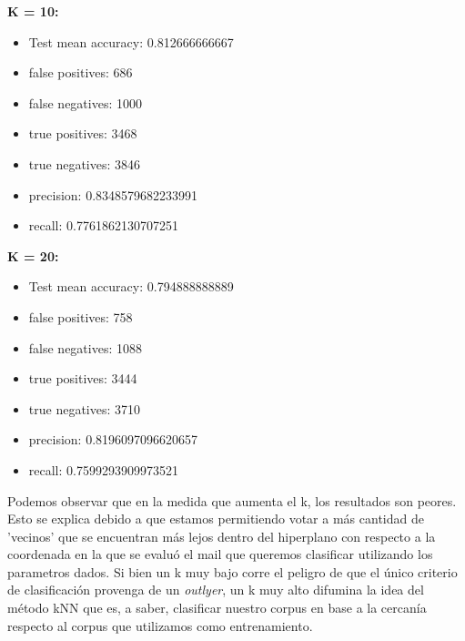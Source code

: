 \documentclass[10pt,a4paper]{article}
\begin{document}
\textbf{K = 10:}
\begin{itemize}
	\item Test mean accuracy: 0.812666666667
	\item false positives: 686
	\item false negatives: 1000
	\item true positives:  3468
	\item true negatives:  3846
	\item precision: 0.8348579682233991
	\item recall: 0.7761862130707251
\end{itemize}
\textbf{K = 20:}
\begin{itemize}
	\item Test mean accuracy: 0.794888888889
	\item false positives: 758
	\item false negatives: 1088
	\item true positives:  3444
	\item true negatives:  3710
	\item precision: 0.8196097096620657
	\item recall: 0.7599293909973521
\end{itemize}

Podemos observar que en la medida que aumenta el k, los resultados son peores. Esto se explica debido a que estamos permitiendo votar a más cantidad de 'vecinos' que se encuentran más lejos dentro del hiperplano con respecto a la coordenada en la que se evaluó el mail que queremos clasificar utilizando los parametros dados. Si bien un k muy bajo corre el peligro de que el único criterio de clasificación provenga de un \textit{outlyer}, un k muy alto difumina la idea del método kNN que es, a saber, clasificar nuestro corpus en base a la cercanía respecto al corpus que utilizamos como entrenamiento.






\end{document}
